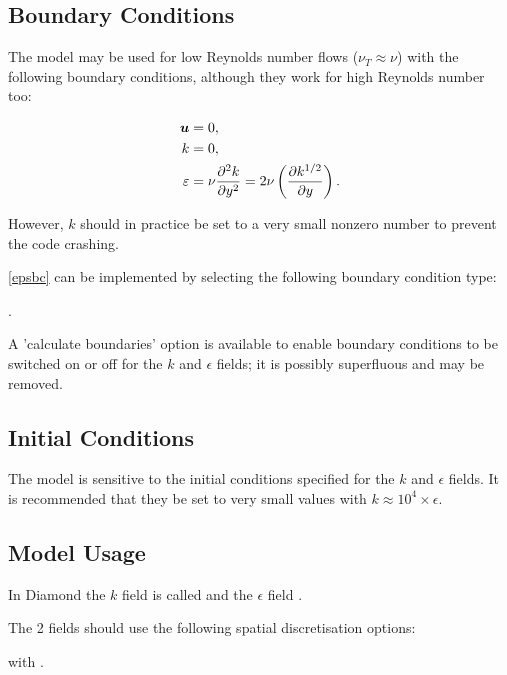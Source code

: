 \subsection{Boundary Conditions}

The model may be used for low Reynolds number flows ($\nu_T \approx \nu$) with the following boundary conditions, although they work for high  Reynolds number too:

\begin{align}
\bmu &= 0, \label{ubc}\\
k &= 0, \label{kbc}\\
\epsilon &= \nu \ppxx[y]{k} = 2 \nu \left ( \ppx[y]{k^{1/2}} \right ). \label{epsbc}
\end{align}

However, $k$ should in practice be set to a very small nonzero number to prevent the code crashing.

\eqref{epsbc} can be implemented by selecting the following boundary condition type:

.

A 'calculate boundaries' option is available to enable boundary conditions to be switched on or off for the $k$ and $\epsilon$ fields; it is possibly superfluous and may be removed.

\subsection{Initial Conditions}

The model is sensitive to the initial conditions specified for the $k$ and $\epsilon$ fields. It is recommended that they be set to very small values with $k \approx 10^4 \times \epsilon$.

\subsection{Model Usage}

In Diamond the $k$ field is called  and the $\epsilon$ field .

The 2 fields should use the following spatial discretisation options:


with .

